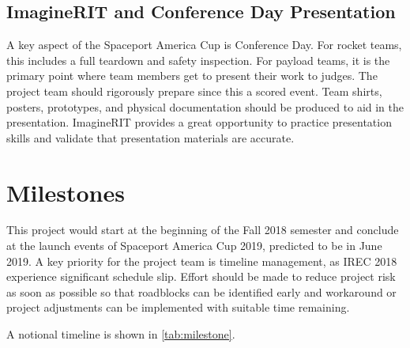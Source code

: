 \documentclass[conference]{IEEEtran} %
\begin{document}
\subsection{ImagineRIT and Conference Day Presentation}
\label{subsec:imagine}

A key aspect of the Spaceport America Cup is Conference Day. For rocket teams, this includes a full teardown and safety inspection. For payload teams, it is the primary point where team members get to present their work to judges. The project team should rigorously prepare since this a scored event. Team shirts, posters, prototypes, and physical documentation should be produced to aid in the presentation. ImagineRIT provides a great opportunity to practice presentation skills and validate that presentation materials are accurate.

\section{Milestones}
\label{sec:milestones}
This project would start at the beginning of the Fall 2018 semester and conclude at the launch events of Spaceport America Cup 2019, predicted to be in June 2019.
A key priority for the project team is timeline management, as IREC 2018 experience significant schedule slip. Effort should be made to reduce project risk as soon as possible so that roadblocks can be identified early and workaround or project adjustments can be implemented with suitable time remaining.

A notional timeline is shown in \autoref{tab:milestone}.
\end{document}
